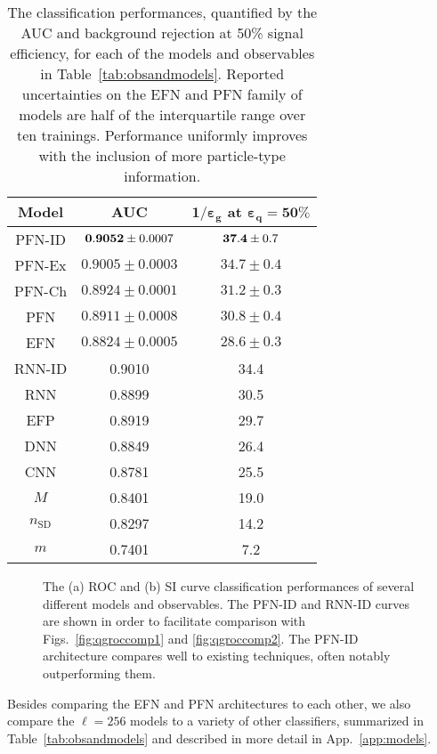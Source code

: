 \documentclass[letterpaper,11pt]{article}
\DeclareRobustCommand{\App}[1]{App.~\ref{#1}}
\DeclareRobustCommand{\Tab}[1]{Table~\ref{#1}}
\DeclareRobustCommand{\Figs}[2]{Figs.~\ref{#1} and \ref{#2}}
\begin{document}
\begin{table}[p]
\centering
\begin{tabular}{|c|c|c|}
\hline
\multicolumn{1}{|c|}{\textbf{Model}}  & {\bf AUC} & {\bf $\boldsymbol{1/\varepsilon_g}$ at  $\boldsymbol{\varepsilon_q=50\%}$}  \\
\hline \hline
PFN-ID & ${\bf 0.9052}\pm0.0007$ & ${\bf 37.4}\pm0.7$ \\
PFN-Ex & $0.9005\pm0.0003$ & $34.7\pm 0.4$ \\
PFN-Ch & $0.8924\pm0.0001$ & $31.2\pm0.3$ \\
PFN & $0.8911\pm0.0008$ & $30.8\pm0.4$ \\
EFN & $0.8824\pm0.0005$ & $28.6\pm0.3$  \\ 
\hline
RNN-ID & 0.9010 & 34.4 \\
RNN & 0.8899 & 30.5 \\
EFP & 0.8919 & 29.7 \\
DNN & 0.8849 & 26.4 \\
CNN & 0.8781 & 25.5 \\
\hline
$M$ & 0.8401 & 19.0 \\
$n_\text{SD}$ & 0.8297 &  14.2\\
$m$ & 0.7401 & 7.2\\
\hline
\end{tabular}
\caption{The classification performances, quantified by the AUC and background rejection at 50\% signal efficiency, for each of the models and observables in \Tab{tab:obsandmodels}.
%
Reported uncertainties on the EFN and PFN family of models are half of the interquartile range over ten trainings.
%
Performance uniformly improves with the inclusion of more particle-type information.
}
\label{tab:qgtabcomp}
\end{table}


\begin{figure}[p]
\caption{The (a) ROC and (b) SI curve classification performances of several different models and observables.
%
The PFN-ID and RNN-ID curves are shown in order to facilitate comparison with \Figs{fig:qgroccomp1}{fig:qgroccomp2}.
%
The PFN-ID architecture compares well to existing techniques, often notably outperforming them.}
\label{fig:qgroccomp3}
\end{figure}

Besides comparing the EFN and PFN architectures to each other, we also compare the $\ell=256$ models to a variety of other classifiers, summarized in \Tab{tab:obsandmodels} and described in more detail in \App{app:models}.
\end{document}
